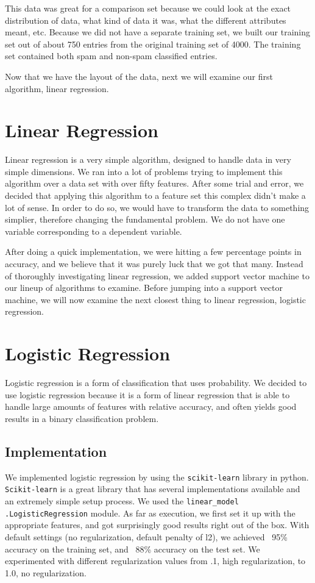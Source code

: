 \documentclass[10pt,letterpaper,onecolumn,draftclsnofoot]{IEEEtran}
\begin{document}
This data was great for a comparison set because we could look at the exact distribution
of data, what kind of data it was, what the different attributes meant, etc. Because we
did not have a separate training set, we built our training set out of about 750 entries
from the original training set of 4000. The training set contained both spam and non-spam
classified entries.

Now that we have the layout of the data, next we will examine our first algorithm,
linear regression.

\section{Linear Regression}
Linear regression is a very simple algorithm, designed to handle data in very simple
dimensions. We ran into a lot of problems trying to implement this algorithm over
a data set with over fifty features. After some trial and error, we decided that
applying this algorithm to a feature set this complex didn't make a lot of sense.
In order to do so, we would have to transform the data to something simplier, 
therefore changing the fundamental problem. We do not have one variable corresponding
to a dependent variable.

After doing a quick implementation, we were hitting a few percentage points in accuracy,
and we believe that it was purely luck that we got that many. Instead of thoroughly
investigating linear regression, we added support vector machine to our lineup of
algorithms to examine. Before jumping into a support vector machine, we will now 
examine the next closest thing to linear regression, logistic regression.

\section{Logistic Regression}
Logistic regression is a form of classification that uses probability. We decided
to use logistic regression because it is a form of linear regression that is able
to handle large amounts of features with relative accuracy, and often yields good
results in a binary classification problem. 
	\subsection{Implementation}
	We implemented logistic regression by using the \texttt{scikit-learn} library
	in python. \texttt{Scikit-learn} is a great library that has several implementations
	available and an extremely simple setup process. We used the \texttt{linear\_model}
	\texttt{.LogisticRegression} module. As far as execution, we first set it up with
	the appropriate features, and got surprisingly good results right out of the box.
	With default settings (no regularization, default penalty of l2), we achieved
	~95\% accuracy on the training set, and ~88\% accuracy on the test set. We
	experimented with different regularization values from .1, high regularization,
	to 1.0, no regularization.
	 
\end{document}
